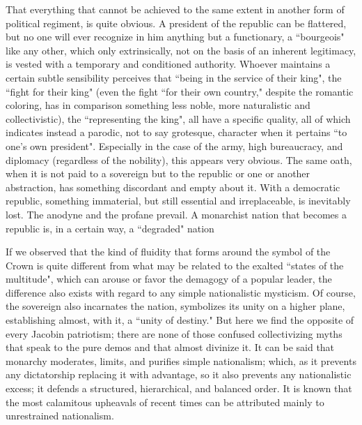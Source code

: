 That everything that cannot be achieved to the same extent in another form of political regiment, is quite obvious. A president of the republic can be flattered, but no one will ever recognize in him anything but a functionary, a ``bourgeois" like any other, which only extrinsically, not on the basis of an inherent legitimacy, is vested with a temporary and conditioned authority. Whoever maintains a certain subtle sensibility perceives that ``being in the service of their king", the ``fight for their king" (even the fight ``for their own country," despite the romantic coloring, has in comparison something less noble, more naturalistic and collectivistic), the ``representing the king", all have a specific quality, all of which indicates instead a parodic, not to say grotesque, character when it pertains ``to one's own president". Especially in the case of the army, high bureaucracy, and diplomacy (regardless of the nobility), this appears very obvious. The same oath, when it is not paid to a sovereign but to the republic or one or another abstraction, has something discordant and empty about it. With a democratic republic, something immaterial, but still essential and irreplaceable, is inevitably lost. The anodyne and the profane prevail. A monarchist nation that becomes a republic is, in a certain way, a ``degraded" nation

If we observed that the kind of fluidity that forms around the symbol of the Crown is quite different from what may be related to the exalted ``states of the multitude", which can arouse or favor the demagogy of a popular leader, the difference also exists with regard to any simple nationalistic mysticism. Of course, the sovereign also incarnates the nation, symbolizes its unity on a higher plane, establishing almost, with it, a ``unity of destiny." But here we find the opposite of every Jacobin patriotism; there are none of those confused collectivizing myths that speak to the pure demos and that almost divinize it. It can be said that monarchy moderates, limits, and purifies simple nationalism; which, as it prevents any dictatorship replacing it with advantage, so it also prevents any nationalistic excess; it defends a structured, hierarchical, and balanced order. It is known that the most calamitous upheavals of recent times can be attributed mainly to unrestrained nationalism.

